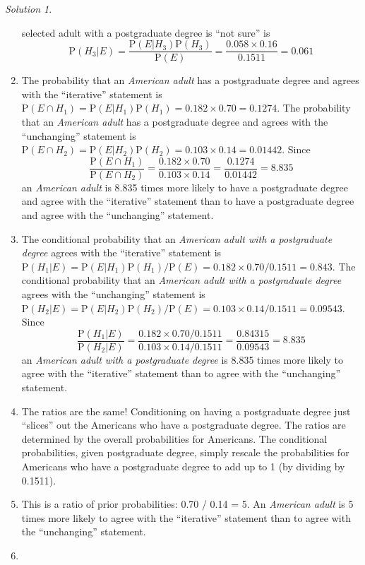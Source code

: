 \documentclass[
  letterpaper,
  DIV=11,
  numbers=noendperiod]{scrreprt}
\theoremstyle{plain}
\theoremstyle{definition}
\theoremstyle{definition}
\theoremstyle{definition}
\theoremstyle{remark}
\newtheorem{refsolution}{Solution}[chapter]
\begin{document}
\begin{tcolorbox}
\begin{refsolution}
\begin{enumerate}
  selected adult with a postgraduate degree is ``not sure'' is \[
  \textrm{P}(H_3 | E) = \frac{\textrm{P}(E | H_3) \textrm{P}(H_3)}{\textrm{P}(E)} = \frac{0.058 \times 0.16}{0.1511} = 0.061
  \]
\item
  The probability that an \emph{American adult} has a postgraduate
  degree and agrees with the ``iterative'' statement is
  \(\textrm{P}(E \cap H_1) = \textrm{P}(E|H_1)\textrm{P}(H_1) = 0.182\times 0.70 = 0.1274\).
  The probability that an \emph{American adult} has a postgraduate
  degree and agrees with the ``unchanging'' statement is
  \(\textrm{P}(E \cap H_2) = \textrm{P}(E|H_2)\textrm{P}(H_2) = 0.103\times 0.14 = 0.01442\).
  Since \[
  \frac{\textrm{P}(E \cap H_1)}{\textrm{P}(E \cap H_2)} = \frac{0.182\times 0.70}{0.103\times 0.14} = \frac{0.1274}{0.01442} = 8.835
  \] an \emph{American adult} is 8.835 times more likely to have a
  postgraduate degree and agree with the ``iterative'' statement than to
  have a postgraduate degree and agree with the ``unchanging''
  statement.
\item
  The conditional probability that an \emph{American adult with a
  postgraduate degree} agrees with the ``iterative'' statement is
  \(\textrm{P}(H_1 | E) = \textrm{P}(E|H_1)\textrm{P}(H_1)/\textrm{P}(E) = 0.182\times 0.70/0.1511 = 0.843\).
  The conditional probability that an \emph{American adult with a
  postgraduate degree} agrees with the ``unchanging'' statement is
  \(\textrm{P}(H_2|E) = \textrm{P}(E|H_2)\textrm{P}(H_2)/\textrm{P}(E) = 0.103\times 0.14/0.1511 = 0.09543\).
  Since \[
  \frac{\textrm{P}(H_1 | E)}{\textrm{P}(H_2 | E)} = \frac{0.182\times 0.70/0.1511}{0.103\times 0.14/0.1511} = \frac{0.84315}{0.09543} = 8.835
  \] an \emph{American adult with a postgraduate degree} is 8.835 times
  more likely to agree with the ``iterative'' statement than to agree
  with the ``unchanging'' statement.
\item
  The ratios are the same! Conditioning on having a postgraduate degree
  just ``slices'' out the Americans who have a postgraduate degree. The
  ratios are determined by the overall probabilities for Americans. The
  conditional probabilities, given postgraduate degree, simply rescale
  the probabilities for Americans who have a postgraduate degree to add
  up to 1 (by dividing by 0.1511).
\item
  This is a ratio of prior probabilities: 0.70 / 0.14 = 5. An
  \emph{American adult} is 5 times more likely to agree with the
  ``iterative'' statement than to agree with the ``unchanging''
  statement.
\item

\end{enumerate}
\end{refsolution}
\end{tcolorbox}
\end{document}
